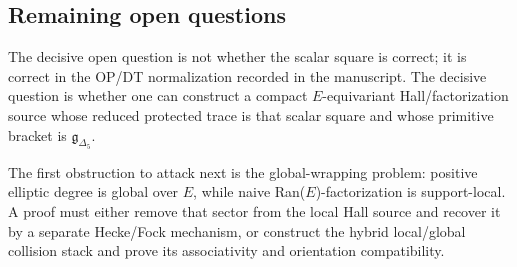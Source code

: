 \subsection{Remaining open questions}

The decisive open question is not whether the scalar square is correct;
it is correct in the OP/DT normalization recorded in the manuscript.  The
decisive question is whether one can construct a compact
\(E\)-equivariant Hall/factorization source whose reduced protected trace
is that scalar square and whose primitive bracket is
\(\mathfrak g_{\Delta_5}\).

The first obstruction to attack next is the global-wrapping problem:
positive elliptic degree is global over \(E\), while naive
Ran(\(E\))-factorization is support-local.  A proof must either remove
that sector from the local Hall source and recover it by a separate
Hecke/Fock mechanism, or construct the hybrid local/global collision
stack and prove its associativity and orientation compatibility.
